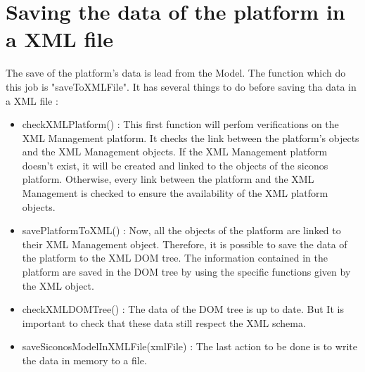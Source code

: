 \section{Saving the data of the platform in a XML file}
The save of the platform's data is lead from the Model. The function which do this job is
"saveToXMLFile". It has several things to do before saving tha data in a XML file :
\begin{itemize}
        \item checkXMLPlatform() : This first function will perfom verifications on the XML Management platform. It checks the
        link between the platform's objects and the XML Management objects. If the XML Management
        platform doesn't exist, it will be created and linked to the objects of the \ac{siconos}
        platform. Otherwise, every link between the platform and the XML Management is checked to ensure
        the availability of the XML platform objects.
        \item savePlatformToXML() : Now, all the objects of the platform are linked to their XML Management object. Therefore,
        it is possible to save the data of the platform to the XML DOM tree. The information
        contained in the platform are saved in the DOM tree by using the specific functions given
        by the XML object.
        \item checkXMLDOMTree() : The data of the DOM tree is up to date. But It is important to check that these data still
        respect the XML schema. 
        \item saveSiconosModelInXMLFile(xmlFile) : The last action to be done is to write the data in memory to a file.
\end{itemize}





